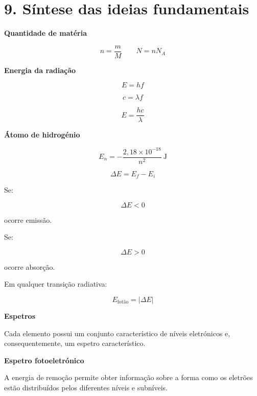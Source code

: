 \documentclass[11pt,a4paper]{article}
\begin{document}
	
	\section*{\textcolor{eublue}{9. Síntese das ideias fundamentais}}
	
	\begin{tcolorbox}[
		colback=eugray,
		colframe=eudark,
		breakable
		]
		
		\textbf{Quantidade de matéria}
		
		\[
		n=\frac{m}{M}
		\qquad
		N=nN_A
		\]
		
		\vspace{3mm}
		
		\textbf{Energia da radiação}
		
		\[
		E=hf
		\]
		
		\[
		c=\lambda f
		\]
		
		\[
		E=\frac{hc}{\lambda}
		\]
		
		\vspace{3mm}
		
		\textbf{Átomo de hidrogénio}
		
		\[
		E_n=
		-\frac{2,18\times10^{-18}}{n^2}
		\ \mathrm{J}
		\]
		
		\[
		\Delta E=E_f-E_i
		\]
		
		Se:
		
		\[
		\Delta E<0
		\]
		
		ocorre emissão.
		
		Se:
		
		\[
		\Delta E>0
		\]
		
		ocorre absorção.
		
		Em qualquer transição radiativa:
		
		\[
		E_{\text{fotão}}
		=
		|\Delta E|
		\]
		
		\vspace{3mm}
		
		\textbf{Espetros}
		
		Cada elemento possui um conjunto característico de níveis eletrónicos
		e, consequentemente, um espetro característico.
		
		\vspace{3mm}
		
		\textbf{Espetro fotoeletrónico}
		
		A energia de remoção permite obter informação sobre a forma como os
		eletrões estão distribuídos pelos diferentes níveis e subníveis.
		

\end{tcolorbox}
\end{document}
